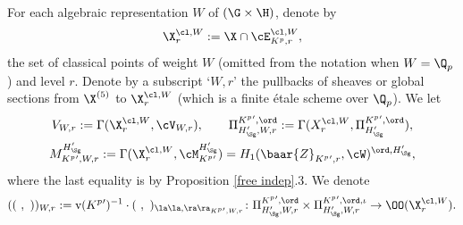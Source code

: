For each algebraic representation $W $ of $(\G\times \H)$, denote by
$$\X_{r}^{\cl,W}:=\X\cap \cE_{K^{p},r}^{\cl , W},$$
the set of classical points of weight $W$ (omitted from the notation when $W=\Q_{p}$) and level $r$. Denote by a subscript `$W,r$' the pullbacks of sheaves or global sections from $\X^{(5)}$ to $\X_{r}^{\cl, W}$ (which is a finite \'etale scheme  over $\Q_{p}$). We let
\begin{gather*}
V_{W,r}:=\Gamma(\X_{r}^{\cl, W}, \cV_{W, r}), \qquad
\Pi_{{H_{\Sg}'}, W, r}^{K^{p}{}', \ord}:=\Gamma(X_{r}^{\cl, W}, \Pi_{{H_{\Sg}'}}^{K^{p}{}', \ord}), \\
M_{K^{p}{}', W, r}^{{H_{\Sg}'}}:= \Gamma(\X_{r}^{\cl, W},  \cM_{K^{p}{}'}^{{H_{\Sg}'}})=  H_{1}(\baar{Z}_{K^{p}{}',r} , \cW)^{\ord,{H_{\Sg}'}},
\end{gather*}
where the last equality is by Proposition \ref{free indep}.3.
We  denote
$$((\ , \ ))_{W, r}:={\rm v}(K^{p}{}')^{-1} \cdot (\ , \ )_{\la \la, \ra\ra_{K^{p}{}', W, r}}\colon \Pi_{{H_{\Sg}'}, W, r}^{K^{p}{}', \ord}\times \Pi_{{H_{\Sg}'}, W, r}^{K^{p}{}', \ord, \iota}\to \OO(\X_{r}^{\cl, W}).$$




